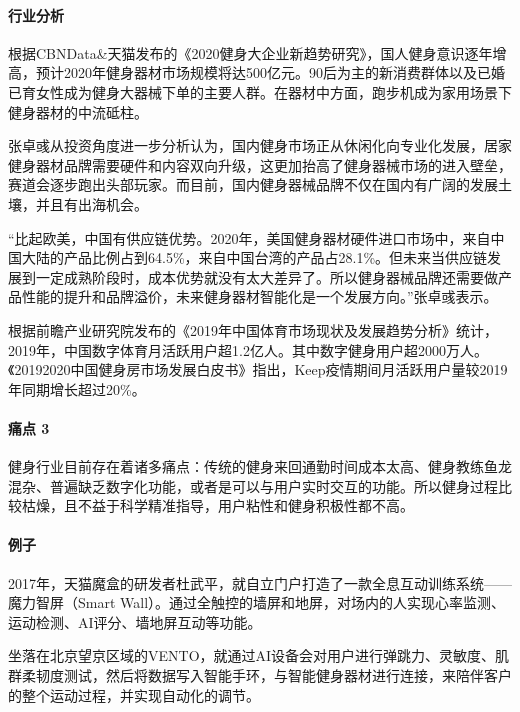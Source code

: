 \documentclass[letterpaper,11pt,english]{sphinxmanual}
\begin{document}
\paragraph{行业分析}
\label{\detokenize{chapter_project/AI_fit:id1}}
根据CBNData\&天猫发布的《2020健身大企业新趋势研究》，国人健身意识逐年增高，预计2020年健身器材市场规模将达500亿元。90后为主的新消费群体以及已婚已育女性成为健身大器械下单的主要人群。在器材中方面，跑步机成为家用场景下健身器材的中流砥柱。

张卓彧从投资角度进一步分析认为，国内健身市场正从休闲化向专业化发展，居家健身器材品牌需要硬件和内容双向升级，这更加抬高了健身器械市场的进入壁垒，赛道会逐步跑出头部玩家。而目前，国内健身器械品牌不仅在国内有广阔的发展土壤，并且有出海机会。

“比起欧美，中国有供应链优势。2020年，美国健身器材硬件进口市场中，来自中国大陆的产品比例占到64.5\%，来自中国台湾的产品占28.1\%。但未来当供应链发展到一定成熟阶段时，成本优势就没有太大差异了。所以健身器械品牌还需要做产品性能的提升和品牌溢价，未来健身器材智能化是一个发展方向。”张卓彧表示。

根据前瞻产业研究院发布的《2019年中国体育市场现状及发展趋势分析》统计，2019年，中国数字体育月活跃用户超1.2亿人。其中数字健身用户超2000万人。《2019\sphinxhyphen{}2020中国健身房市场发展白皮书》指出，Keep疫情期间月活跃用户量较2019年同期增长超过20\%。


\paragraph{痛点 3\sphinxfootnotemark[240]}
\label{\detokenize{chapter_project/AI_fit:id2}}%
\begin{footnotetext}[240]\sphinxAtStartFootnote
{}
%
\end{footnotetext}\ignorespaces 
健身行业目前存在着诸多痛点：传统的健身来回通勤时间成本太高、健身教练鱼龙混杂、普遍缺乏数字化功能，或者是可以与用户实时交互的功能。所以健身过程比较枯燥，且不益于科学精准指导，用户粘性和健身积极性都不高。


\paragraph{例子}
\label{\detokenize{chapter_project/AI_fit:id3}}
2017年，天猫魔盒的研发者杜武平，就自立门户打造了一款全息互动训练系统——魔力智屏（Smart
Wall）。通过全触控的墙屏和地屏，对场内的人实现心率监测、运动检测、AI评分、墙地屏互动等功能。

坐落在北京望京区域的VENTO，就通过AI设备会对用户进行弹跳力、灵敏度、肌群柔韧度测试，然后将数据写入智能手环，与智能健身器材进行连接，来陪伴客户的整个运动过程，并实现自动化的调节。
\end{document}
